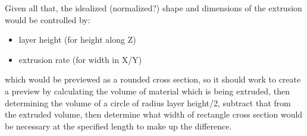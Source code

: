 \documentclass{ltxdoc}
\begin{document}
Given all that, the idealized (normalized?) shape and dimensions of the extrusion would be controlled by:

\begin{itemize}
\item layer height (for height along Z)
\item extrusion rate (for width in X/Y)
\end{itemize}

\noindent which would be previewed as a rounded cross section, so it should work to create a preview by calculating the volume of material which is being extruded, then determining the volume of a circle of radius layer height/2, subtract that from the extruded volume, then determine what width of rectangle cross section would be necessary at the specified length to make up the difference.


%
\end{document}

